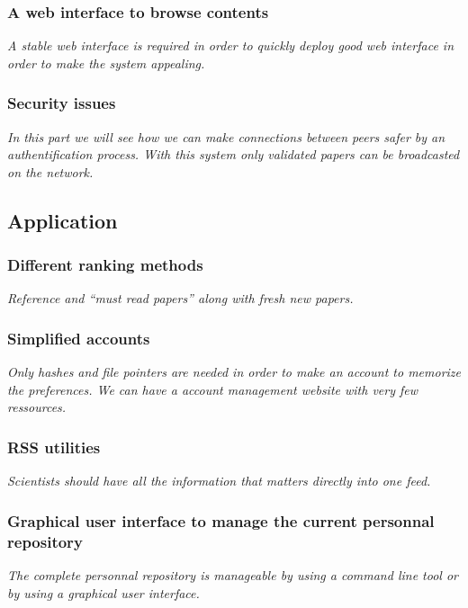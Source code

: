 \subsubsection{A web interface to browse contents}

\textit{A stable web interface is required in order to
quickly deploy good web interface in order to make the system
appealing.}

\subsubsection{Security issues}

\textit{In this part we will see how we can make connections
between peers safer by an authentification process. With this
system only validated papers can be broadcasted on the network.}

\subsection{Application}

\subsubsection{Different ranking methods}

\textit{Reference and ``must read papers'' along with fresh new papers.}

\subsubsection{Simplified accounts}

\textit{Only hashes and file pointers are needed in order to make an
account to memorize the preferences. We can have a account management
website with very few ressources.}

\subsubsection{RSS utilities}

\textit{Scientists should have all the information that matters directly into
one feed.}

\subsubsection{Graphical user interface to manage the current personnal repository}

\textit{The complete personnal repository is manageable by using a command line
tool or by using a graphical user interface.}

